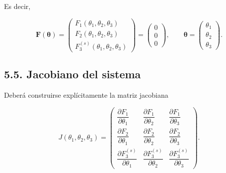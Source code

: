 \documentclass[12pt]{article}
\begin{document}
Es decir,

\[
\mathbf{F}(\boldsymbol{\theta})=
\begin{pmatrix}
F_1(\theta_1,\theta_2,\theta_3)\\
F_2(\theta_1,\theta_2,\theta_3)\\
F_3^{(s)}(\theta_1,\theta_2,\theta_3)
\end{pmatrix}
=
\begin{pmatrix}
0\\
0\\
0
\end{pmatrix},
\qquad
\boldsymbol{\theta}=
\begin{pmatrix}
\theta_1\\
\theta_2\\
\theta_3
\end{pmatrix}.
\]

\subsection*{5.5. Jacobiano del sistema}

Deberá construirse explícitamente la matriz jacobiana

\[
J(\theta_1,\theta_2,\theta_3)=
\begin{pmatrix}
\dfrac{\partial F_1}{\partial \theta_1} &
\dfrac{\partial F_1}{\partial \theta_2} &
\dfrac{\partial F_1}{\partial \theta_3} \\[1em]
\dfrac{\partial F_2}{\partial \theta_1} &
\dfrac{\partial F_2}{\partial \theta_2} &
\dfrac{\partial F_2}{\partial \theta_3} \\[1em]
\dfrac{\partial F_3^{(s)}}{\partial \theta_1} &
\dfrac{\partial F_3^{(s)}}{\partial \theta_2} &
\dfrac{\partial F_3^{(s)}}{\partial \theta_3}
\end{pmatrix}.
\]

%
\end{document}
